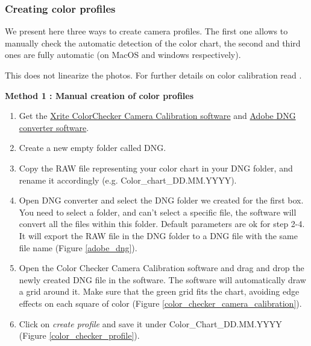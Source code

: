 \documentclass[10pt,letter,english]{article}
\begin{document}
\subsubsection{Creating color profiles}

\noindent We present here three ways to create camera profiles. The first one allows to manually check the automatic detection of the color chart, the second and third ones are fully automatic (on MacOS and windows respectively).

\noindent\warning This does not linearize the photos. For further details on color calibration read \cite{troscianko2015image}.

\bigskip
\noindent \textbf{Method 1 : Manual creation of color profiles}

\begin{enumerate}
    \item Get the \href{https://xritephoto.com/ph_product_overview.aspx?ID=938&Action=Support&SoftwareID=2030}{Xrite ColorChecker Camera Calibration software} and  \href{https://helpx.adobe.com/photoshop/using/adobe-dng-converter.html}{Adobe DNG converter software}.
    \item Create a new empty folder called DNG.
    \item Copy the RAW file representing your color chart in your DNG folder, and rename it accordingly (e.g. Color\_chart\_DD.MM.YYYY).
    \item Open DNG converter and select the DNG folder we created for the first box. You need to select a folder, and can't select a specific file, the software will convert all the files within this folder. Default parameters are ok for step 2-4. It will export the RAW file in the DNG folder to a DNG file with the same file name (Figure \ref{adobe_dng}). 
    \item Open the Color Checker Camera Calibration software and drag and drop the newly created DNG file in the software. The software will automatically draw a grid around it. Make sure that the green grid fits the chart, avoiding edge effects on each square of color (Figure \ref{color_checker_camera_calibration}).
    \item Click on \textit{create profile} and save it under Color\_Chart\_DD.MM.YYYY (Figure \ref{color_checker_profile}).
\end{enumerate}
\end{document}
